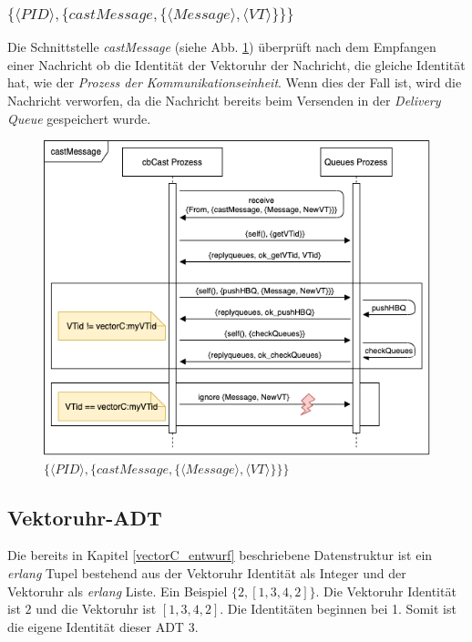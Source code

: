 \subsubsection{$\{\langle PID \rangle,\{castMessage,\{\langle Message \rangle, \langle VT \rangle\}\}\}$}

Die Schnittstelle \textit{castMessage} (siehe Abb. \ref{fig:sequence_cast_realisierung}) überprüft nach dem Empfangen einer Nachricht ob die Identität der Vektoruhr der Nachricht, die gleiche Identität hat, wie der \textit{Prozess der Kommunikationseinheit}. Wenn dies der Fall ist, wird die Nachricht verworfen, da die Nachricht bereits beim Versenden in der \textit{Delivery Queue} gespeichert wurde.

\begin{figure}[htbp]
\begin{center}
\includegraphics[scale=0.6]{Latex/Bilder/cast_realisierung.png}
\caption{\label{fig:sequence_cast_realisierung} $\{\langle PID \rangle,\{castMessage,\{\langle Message \rangle, \langle VT \rangle\}\}\}$}
\end{center}
\end{figure}

\subsection{Vektoruhr-ADT} \label{vectorC_realisierung}

Die bereits in Kapitel \ref{vectorC_entwurf} beschriebene Datenstruktur ist ein \textit{erlang} Tupel bestehend aus der Vektoruhr Identität als Integer und der Vektoruhr als \textit{erlang} Liste. Ein Beispiel $\{2, [1,3,4,2]\}$. Die Vektoruhr Identität ist $2$ und die Vektoruhr ist $[1,3,4,2]$. Die Identitäten beginnen bei 1. Somit ist die eigene Identität dieser ADT $3$.

